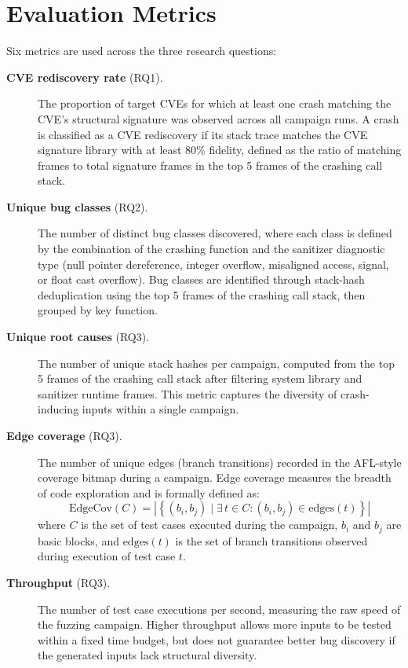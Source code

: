 \section{Evaluation Metrics}
\label{sec:metrics}

Six metrics are used across the three research questions:

\begin{description}
  \item[\textbf{CVE rediscovery rate} (RQ1).] The proportion of target CVEs for which at least one crash matching the CVE's structural signature was observed across all campaign runs. A crash is classified as a CVE rediscovery if its stack trace matches the CVE signature library with at least 80\% fidelity, defined as the ratio of matching frames to total signature frames in the top 5 frames of the crashing call stack.

  \item[\textbf{Unique bug classes} (RQ2).] The number of distinct bug classes discovered, where each class is defined by the combination of the crashing function and the sanitizer diagnostic type (null pointer dereference, integer overflow, misaligned access, signal, or float cast overflow). Bug classes are identified through stack-hash deduplication using the top 5 frames of the crashing call stack, then grouped by key function.

  \item[\textbf{Unique root causes} (RQ3).] The number of unique stack hashes per campaign, computed from the top 5 frames of the crashing call stack after filtering system library and sanitizer runtime frames. This metric captures the diversity of crash-inducing inputs within a single campaign.

  \item[\textbf{Edge coverage} (RQ3).] The number of unique edges (branch transitions) recorded in the AFL-style coverage bitmap during a campaign. Edge coverage measures the breadth of code exploration and is formally defined as:
  \begin{equation}
    \text{EdgeCov}(C) = \left|\left\{ (b_i, b_j) \mid \exists\, t \in C : (b_i, b_j) \in \text{edges}(t) \right\}\right|
    \label{eq:edgecov}
  \end{equation}
  where $C$ is the set of test cases executed during the campaign, $b_i$ and $b_j$ are basic blocks, and $\text{edges}(t)$ is the set of branch transitions observed during execution of test case $t$.

  \item[\textbf{Throughput} (RQ3).] The number of test case executions per second, measuring the raw speed of the fuzzing campaign. Higher throughput allows more inputs to be tested within a fixed time budget, but does not guarantee better bug discovery if the generated inputs lack structural diversity.


\end{description}
